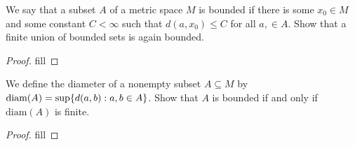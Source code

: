 \begin{exercise}{14}
We say that a subset $A$ of a metric space $M$ is bounded if there is some $x_0\in M$ and some constant $C<\infty$ such that $d(a,x_0)\leq C$ for all $a,\in A$. Show that a finite union of bounded sets is again bounded.
\end{exercise}
\begin{proof}
fill
\end{proof} 

\begin{exercise}{15}
We define the diameter of a nonempty subset $A\subseteq M$ by $\text{diam}(A)=\sup\{d(a,b):a,b\in A\}$. Show that $A$ is bounded if and only if $\text{diam}(A)$ is finite. 
\end{exercise}
\begin{proof}
fill
\end{proof} 
